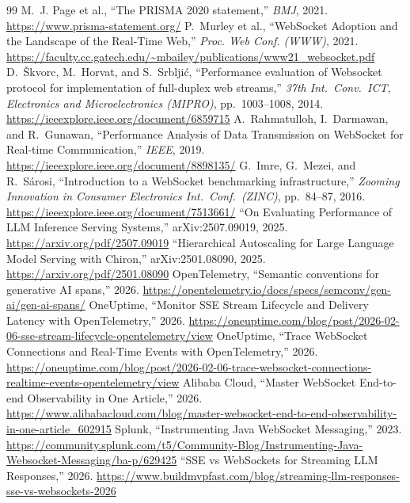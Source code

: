 \documentclass[11pt]{article}
\begin{document}
\begin{thebibliography}{99}
 M.~J. Page et al., ``The PRISMA 2020 statement,'' \emph{BMJ}, 2021. \url{https://www.prisma-statement.org/}
 P.~Murley et al., ``WebSocket Adoption and the Landscape of the Real-Time Web,'' \emph{Proc. Web Conf. (WWW)}, 2021. \url{https://faculty.cc.gatech.edu/~mbailey/publications/www21_websocket.pdf}
 D.~\v{S}kvorc, M.~Horvat, and S.~Srblji\'{c}, ``Performance evaluation of Websocket protocol for implementation of full-duplex web streams,'' \emph{37th Int.\ Conv.\ ICT, Electronics and Microelectronics (MIPRO)}, pp.~1003--1008, 2014. \url{https://ieeexplore.ieee.org/document/6859715}
 A.~Rahmatulloh, I.~Darmawan, and R.~Gunawan, ``Performance Analysis of Data Transmission on WebSocket for Real-time Communication,'' \emph{IEEE}, 2019. \url{https://ieeexplore.ieee.org/document/8898135/}
 G.~Imre, G.~Mezei, and R.~S\'{a}rosi, ``Introduction to a WebSocket benchmarking infrastructure,'' \emph{Zooming Innovation in Consumer Electronics Int.\ Conf.\ (ZINC)}, pp.~84--87, 2016. \url{https://ieeexplore.ieee.org/document/7513661/}
 ``On Evaluating Performance of LLM Inference Serving Systems,'' arXiv:2507.09019, 2025. \url{https://arxiv.org/pdf/2507.09019}
 ``Hierarchical Autoscaling for Large Language Model Serving with Chiron,'' arXiv:2501.08090, 2025. \url{https://arxiv.org/pdf/2501.08090}
 OpenTelemetry, ``Semantic conventions for generative AI spans,'' 2026. \url{https://opentelemetry.io/docs/specs/semconv/gen-ai/gen-ai-spans/}
 OneUptime, ``Monitor SSE Stream Lifecycle and Delivery Latency with OpenTelemetry,'' 2026. \url{https://oneuptime.com/blog/post/2026-02-06-sse-stream-lifecycle-opentelemetry/view}
 OneUptime, ``Trace WebSocket Connections and Real-Time Events with OpenTelemetry,'' 2026. \url{https://oneuptime.com/blog/post/2026-02-06-trace-websocket-connections-realtime-events-opentelemetry/view}
 Alibaba Cloud, ``Master WebSocket End-to-end Observability in One Article,'' 2026. \url{https://www.alibabacloud.com/blog/master-websocket-end-to-end-observability-in-one-article_602915}
 Splunk, ``Instrumenting Java WebSocket Messaging,'' 2023. \url{https://community.splunk.com/t5/Community-Blog/Instrumenting-Java-Websocket-Messaging/ba-p/629425}
 ``SSE vs WebSockets for Streaming LLM Responses,'' 2026. \url{https://www.buildmvpfast.com/blog/streaming-llm-responses-sse-vs-websockets-2026}

\end{thebibliography}
\end{document}
